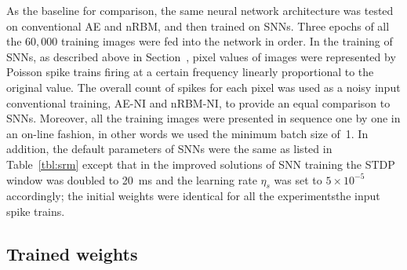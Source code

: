 As the baseline for comparison, the same neural network architecture was \DIFdelbegin {}\DIFdelend \DIFaddbegin {}\DIFaddend tested on conventional AE and nRBM, and then trained on SNNs.
Three epochs of all the $60,000$ training images were fed into the network in order.
In the training of SNNs, as described above in Section~\DIFdelbegin \DIFdel{\ref{sec:ae}}\DIFdelend \DIFaddbegin \DIFadd{\ref{subsec:SNN_setup}}\DIFaddend , pixel values of images were represented by Poisson spike trains firing at a certain frequency linearly proportional to the original value.
The overall count of spikes for each pixel was used as a noisy input \DIFdelbegin {}\DIFdelend \DIFaddbegin {}\DIFaddend conventional training, AE-NI and nRBM-NI, to provide an equal comparison to SNNs.
Moreover, all the training images were presented in sequence one by one in an on-line fashion, in other words we used the minimum batch size of~1.
In addition, the default parameters of SNNs were the same as listed in Table~\ref{tbl:srm} except that in the improved solutions of SNN training the STDP window \DIFdelbegin {}\DIFdelend \DIFaddbegin {}\DIFaddend was doubled to 20~ms and the learning rate $\eta_s$ was set to $5 \times 10^{-5}$ accordingly;
the initial weights were identical for all the experiments\DIFdelbegin {}\DIFdelend \DIFaddbegin {}\DIFaddend the input spike trains.


\subsection{Trained weights}
\DIFdelbegin %

